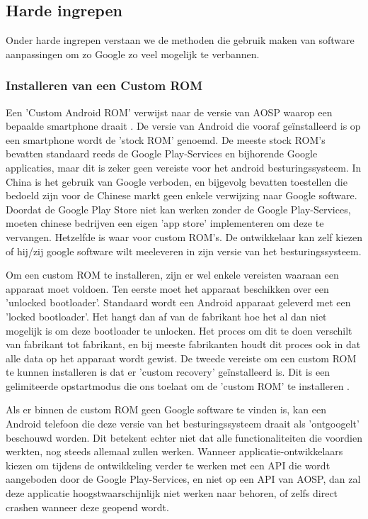 \subsection{Harde ingrepen}

Onder harde ingrepen verstaan we de methoden die gebruik maken van software aanpassingen om zo Google zo veel mogelijk te verbannen.

\subsubsection{Installeren van een Custom ROM}
\label{installcustomrom}
Een 'Custom Android ROM' verwijst naar de versie van AOSP waarop een bepaalde smartphone draait \autocite{custom-rom}. De versie van Android die vooraf geïnstalleerd is op een smartphone wordt de 'stock ROM' genoemd. De meeste stock ROM's bevatten standaard reeds de Google Play-Services en bijhorende Google applicaties, maar dit is zeker geen vereiste voor het android besturingssysteem. In China is het gebruik van Google verboden, en bijgevolg bevatten toestellen die bedoeld zijn voor de Chinese markt geen enkele verwijzing naar Google software. Doordat de Google Play Store niet kan werken zonder de Google Play-Services, moeten chinese bedrijven een eigen 'app store' implementeren om deze te vervangen. Hetzelfde is waar voor custom ROM's. De ontwikkelaar kan zelf kiezen of hij/zij google software wilt meeleveren in zijn versie van het besturingssysteem.

Om een custom ROM te installeren, zijn er wel enkele vereisten waaraan een apparaat moet voldoen. Ten eerste moet het apparaat beschikken over een 'unlocked bootloader'. Standaard wordt een Android apparaat geleverd met een 'locked bootloader'. Het hangt dan af van de fabrikant hoe het al dan niet mogelijk is om deze bootloader te unlocken. Het proces om dit te doen verschilt van fabrikant tot fabrikant, en bij meeste fabrikanten houdt dit proces ook in dat alle data op het apparaat wordt gewist. De tweede vereiste om een custom ROM te kunnen installeren is dat er 'custom recovery' geïnstalleerd is. Dit is een gelimiteerde opstartmodus die ons toelaat om de 'custom ROM' te installeren \autocite{hoffman_custom-recovery}.

Als er binnen de custom ROM geen Google software te vinden is, kan een Android telefoon die deze versie van het besturingssysteem draait als 'ontgoogelt' beschouwd worden. Dit betekent echter niet dat alle functionaliteiten die voordien werkten, nog steeds allemaal zullen werken. Wanneer applicatie-ontwikkelaars kiezen om tijdens de ontwikkeling verder te werken met een API die wordt aangeboden door de Google Play-Services, en niet op een API van AOSP, dan zal deze applicatie hoogstwaarschijnlijk niet werken naar behoren, of zelfs direct crashen wanneer deze geopend wordt.

